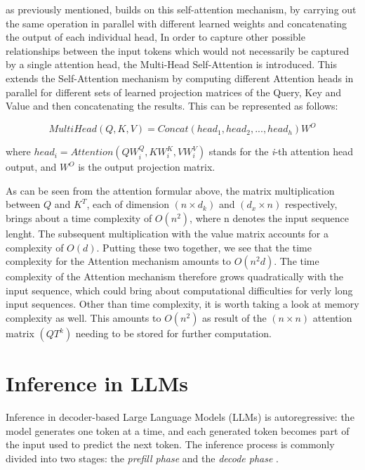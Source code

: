  as previously mentioned, builds on this self-attention mechanism, by carrying out the same operation in parallel with different learned weights and concatenating the output of each individual head, In order to capture other possible relationships between the input tokens which would not necessarily be captured by a single attention head, the Multi-Head Self-Attention is introduced. This extends the Self-Attention mechanism by computing different Attention heads in parallel for different sets of learned projection matrices of the Query, Key and Value and then concatenating the results.  This can be represented as follows:

\[ 
  MultiHead(Q,K,V) = Concat(head_1,head_2,...,head_h) W^O
\]

where \( head_i = Attention(QW_i^Q, KW_i^K,VW_i^V) \) stands for the \textit{i}-th attention head output, and $W^O$ is the output projection matrix. \cite{bai2024beyond} 

As can be seen from the attention formular above, the matrix multiplication between $Q$ and $K^T$, each of dimension $(n \times d_k)$ and $(d_x \times n)$ respectively, brings about a time complexity of $O(n^2)$, where n denotes the input sequence lenght. The subsequent multiplication with the value matrix accounts for a complexity of $O(d)$. Putting these two together, we see that the time complexity for the Attention mechanism amounts to $O(n^2d)$. The time complexity of the Attention mechanism therefore grows quadratically with the input sequence, which could bring about computational difficulties for verly long input sequences. Other than time complexity, it is worth taking a look at memory complexity as well. This amounts to $O(n^2)$ as result of the $(n \times n)$ attention matrix $(QT^k)$ needing to be stored for further computation.

\section{Inference in LLMs}
\label{sec:llm-inference}

Inference in decoder-based Large Language Models (LLMs) is autoregressive: the model
generates one token at a time, and each generated token becomes part of the input used
to predict the next token. The inference process is commonly divided into two stages:
the \emph{prefill phase} and the \emph{decode phase}
\cite{yuan2024llminference,zhou2024efficientinf}.

